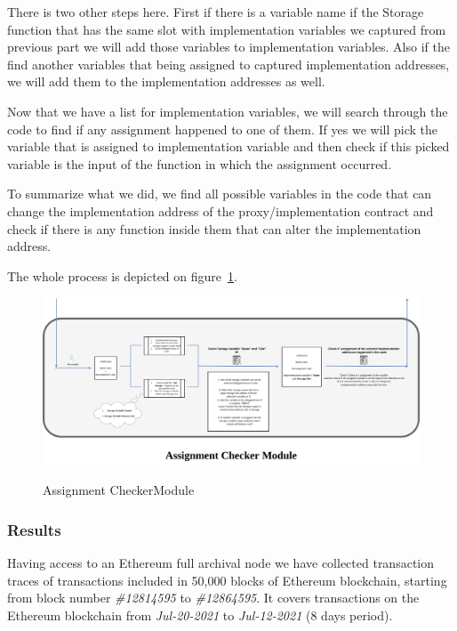 There is two other steps here. First if there is a variable name if the Storage function that has the same slot with implementation variables we captured from previous part we will add those variables to implementation variables. Also if the find another variables that being assigned to captured implementation addresses, we will add them to the implementation addresses as well.

Now that we have a list for implementation variables, we will search through the code to find if any assignment happened to one of them. If yes we will pick the variable that is assigned to implementation variable and then check if this picked variable is the input of the function in which the assignment occurred.

To summarize what we did, we find all possible variables in the code that can change the implementation address of the proxy/implementation contract and check if there is any function inside them that can alter the implementation address.

The whole process is depicted on figure~\ref{fig:assignmentFinder}.

\begin{figure}[t]
  \includegraphics[width=1.2\textwidth]{figures/Assignment_finder.png}\label{fig:assignmentFinder}
  \caption{Assignment CheckerModule}
\end{figure}

\subsubsection{Results}
Having access to an Ethereum full archival node we have collected transaction traces of transactions included in 50,000 blocks of Ethereum blockchain, starting from block number \textit{\#12814595} to \textit{\#12864595}. It covers transactions on the Ethereum blockchain from \textit{Jul-20-2021} to \textit{Jul-12-2021} (8 days period). 

